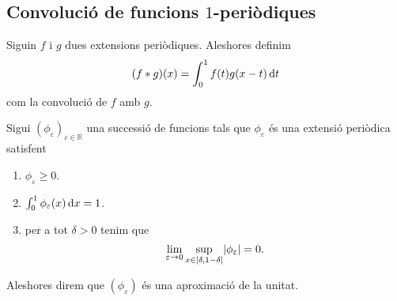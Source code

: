 \documentclass[../../Main.tex]{subfiles}
\begin{document}
	\subsection{Convolució de funcions \ensuremath{1}-periòdiques}
	\begin{definition}
		\label{def:convolució de dues extensions periòdiques}
		Siguin \(f\) i \(g\) dues extensions periòdiques. Aleshores definim
		\[(f\mathbin{\ast} g)(x)=\int_{0}^{1}f(t)g(x-t)\mathop{}\!\mathrm{d} t\]
		com la convolució de \(f\) amb \(g\).
	\end{definition}
	\begin{definition}
		\label{def:aproximació de la unitat en extensions periòdiques}
		Sigui \((\phi_{\varepsilon})_{\varepsilon\in\mathbb{R}}\) una successió de funcions tals que \(\phi_{\varepsilon}\) és una extensió periòdica satisfent
		\begin{enumerate}
			\item \(\phi_{\varepsilon}\geq0\).
			\item \(\int_{0}^{1}\phi_{\varepsilon}(x)\mathop{}\!\mathrm{d} x=1\).
			\item per a tot \(\delta>0\) tenim que
			\[\lim_{\varepsilon\to0}\sup_{x\in[\delta,1-\delta]}\abs{\phi_{\varepsilon}}=0.\]
		\end{enumerate}
		Aleshores direm que \((\phi_{\varepsilon})\) és una aproximació de la unitat.
	\end{definition}
\end{document}
